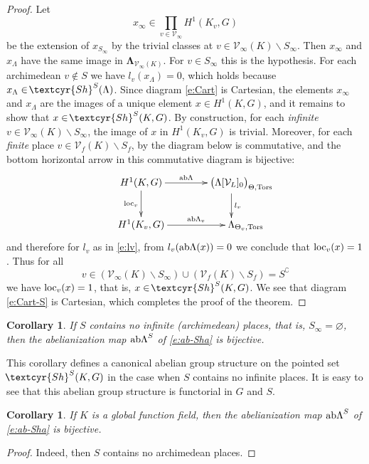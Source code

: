 \documentclass[11pt]{amsart}
\newcommand{\Sha}{{\!\textcyr{Sh}}}
\theoremstyle{plain}
\newtheorem{corollary}[theorem]{Corollary}
\theoremstyle{definition}
\newcommand{\ab}{{\rm ab}}
\newcommand{\hs}{\kern 0.8pt}
\newcommand{\V}{{\mathcal V}}
\newcommand{\Tors}{{\rm Tors}}
\newcommand{\LambdaB}{{\boldsymbol{\Lambda}}}
\newcommand{\Thvt}{{\Theta_v,\Tors}}
\newcommand{\Tht}{{\Theta,\Tors}}
\newcommand{\loc}{{\rm loc}}
\newcommand{\abLambda}{{{\rm ab}\Lambda}}
\begin{document}
\begin{proof}
Let
\[ x_\infty\in  \prod\limits_{v\in \V_\infty}\!\! H^1(K_v,G)\]
be the extension of $x_{S_\infty}$ by the trivial classes
at $v\in\V_\infty(K)\smallsetminus S_\infty$.
Then $x_{\infty}$ and $x_\Lambda$ have the same image in $\LambdaB_{\V_\infty(K)}$.
For $v\in S_\infty$ this is the hypothesis.
For each archimedean $v\notin S$ we have $l_v(x_\Lambda)=0$,
which holds because $x_\Lambda\in\Sha^S(\Lambda)$.
Since diagram \eqref{e:Cart} is Cartesian,
the elements $x_{\infty}$ and $x_\Lambda$ are the images of a unique element $x\in H^1(K,G)$,
and it remains to show that $x\in\Sha^S(K,G)$.
By construction, for each {\em infinite} $v\in \V_\infty(K)\smallsetminus S_\infty$\hs,
the image of $x$ in  $H^1(K_v,G)$ is trivial.
Moreover, for each {\em finite} place $v\in\V_f(K)\smallsetminus S_f$\hs,
by \cite[Proposition 4.6.2 together with Theorems 5.5.2(1) and 5.5.4(1)]{BK}
the diagram below is commutative, and
the bottom horizontal arrow in this commutative diagram is bijective:
\[
\xymatrix@C=14mm{
H^1(K,G)\ar[r]^-\abLambda\ar[d]_-{\loc_v} & \big(\Lambda[\V_L]_0\big)_\Tht\hskip-7mm\ar[d]^-{l_v}\\
H^1(K_v,G) \ar[r]^-{\ab\Lambda_v}  &\Lambda_\Thvt\hskip-10mm
}
\]
and therefore for $l_v$ as in \eqref{e:lv}, from $l_v(\abLambda(x))=0$ we conclude that $\loc_v(x)=1$.
Thus for all
$$v\in(\V_\infty(K)\smallsetminus S_\infty)\cup(\V_f(K)\smallsetminus S_f)=S^\complement$$
we have $\loc_v(x)=1$, that is, $x\in\Sha^S(K,G)$.
We see that diagram \eqref{e:Cart-S} is Cartesian,
which completes the proof of the theorem.
\end{proof}

\begin{corollary}
If $S$ contains no infinite (archimedean)  places, that is, $S_\infty=\varnothing$,
then the abelianization map $\abLambda^S$ of  \eqref{e:ab-Sha} is bijective.
\end{corollary}

This corollary defines a canonical abelian group structure
on the pointed set $\Sha^S(K,G)$ in the case when $S$ contains no infinite places.
It is easy to see that this abelian group structure is functorial in $G$ and $S$.

\begin{corollary}
If $K$ is a global function field, then the abelianization map
$\abLambda^S$ of  \eqref{e:ab-Sha} is bijective.
\end{corollary}

\begin{proof}
Indeed, then $S$ contains no archimedean places.
\end{proof}
\end{document}
